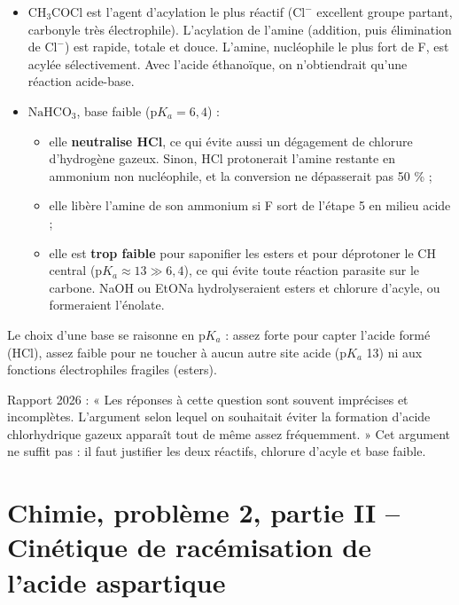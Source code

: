 \documentclass[11pt,a4paper]{article}
\providecommand{\tightlist}{\setlength{\itemsep}{0pt}\setlength{\parskip}{0pt}}
\begin{document}
\begin{itemize}
\tightlist
\item
  \textbf{\(\mathrm{CH_3COCl}\)} est l'agent d'acylation le plus réactif (\(\mathrm{Cl^-}\) excellent groupe partant, carbonyle très électrophile). L'acylation de l'amine (addition, puis élimination de \(\mathrm{Cl^-}\)) est rapide, totale et douce. L'amine, nucléophile le plus fort de F, est acylée sélectivement. Avec l'acide éthanoïque, on n'obtiendrait qu'une réaction acide-base.
\item
  \textbf{\(\mathrm{NaHCO_3}\)}, base faible (\(\mathrm{p}K_a=6{,}4\)) :

  \begin{itemize}
  \tightlist
  \item
    elle \textbf{neutralise HCl}, ce qui évite aussi un dégagement de chlorure d'hydrogène gazeux. Sinon, HCl protonerait l'amine restante en ammonium non nucléophile, et la conversion ne dépasserait pas 50 \% ;
  \item
    elle libère l'amine de son ammonium si F sort de l'étape 5 en milieu acide ;
  \item
    elle est \textbf{trop faible} pour saponifier les esters et pour déprotoner le CH central (\(\mathrm{p}K_a\approx13\gg6{,}4\)), ce qui évite toute réaction parasite sur le carbone. NaOH ou EtONa hydrolyseraient esters et chlorure d'acyle, ou formeraient l'énolate.
  \end{itemize}
\end{itemize}

\begin{methode}

Le choix d'une base se raisonne en \(\mathrm{p}K_a\) : assez forte pour capter l'acide formé (HCl), assez faible pour ne toucher à aucun autre site acide (\(\mathrm{p}K_a\) 13) ni aux fonctions électrophiles fragiles (esters).

\end{methode}

\begin{jury}

Rapport 2026 : « Les réponses à cette question sont souvent imprécises et incomplètes. L'argument selon lequel on souhaitait éviter la formation d'acide chlorhydrique gazeux apparaît tout de même assez fréquemment. » Cet argument ne suffit pas : il faut justifier les deux réactifs, chlorure d'acyle et base faible.

\end{jury}

\hypertarget{chimie-probluxe8me-2-partie-ii-cinuxe9tique-de-racuxe9misation-de-lacide-aspartique}{%
\section{Chimie, problème 2, partie II -- Cinétique de racémisation de l'acide aspartique}\label{chimie-probluxe8me-2-partie-ii-cinuxe9tique-de-racuxe9misation-de-lacide-aspartique}}
\end{document}
